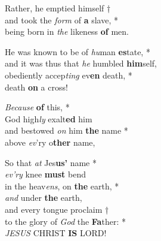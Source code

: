 
Rather, he emptied himself †\\
and took the \emph{form} of \textbf{a} slave, *\\
being born in \emph{the} likeness \textbf{of} men.

He was known to be of \emph{hu}man \textbf{es}tate, *\\
and it was thus that \emph{he} humbled \textbf{him}self,\\
obediently accep\emph{ting} ev\textbf{en} death, *\\
death \textbf{on} a cross!

\emph{Because} \textbf{of} this, *\\
God high\emph{ly} exalt\textbf{ed} him\\
and bestowed \emph{on} him \textbf{the} name *\\
above \emph{ev}'ry o\textbf{ther} name,

So that \emph{at} Jes\textbf{us'} name *\\
\emph{ev'ry} knee \textbf{must} bend\\
in the heav\emph{ens}, on \textbf{the} earth, *\\
\emph{and} under \textbf{the} earth,\\
and every tongue proclaim †\\
to the glory of \emph{God} the \textbf{Fa}ther: *\\
\emph{JESUS} CHRIST \textbf{IS} LORD!

